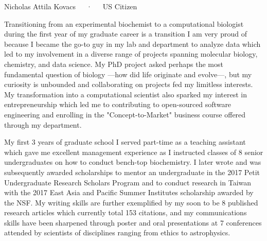 \documentclass[11pt, letterpaper]{CV_latex_class}
\begin{document}
\makecvheader

\makecvfooter
  {Nicholas Attila Kovacs~~~·~~~US Citizen}

\makelettertitle

\begin{cvletter}


\hspace{1em} Transitioning from an experimental biochemist to a computational biologist during the first year of my graduate career is a transition I am very proud of because I became the go-to guy in my lab and department to analyze data which led to my involvement in a diverse range of projects spanning molecular biology, chemistry, and data science. My PhD project asked perhaps the most fundamental question of biology ---how did life originate and evolve---, but my curiosity is unbounded and collaborating on projects fed my limitless interests. My transformation into a computational scientist also sparked my interest in entrepreneurship which led me to contributing to open-sourced software engineering and enrolling in the "Concept-to-Market" business course offered through my department.

\hspace{1em} My first 3 years of graduate school I served part-time as a teaching assistant which gave me excellent management experience as I instructed classes of 8 senior undergraduates on how to conduct bench-top biochemistry. I later wrote and was subsequently awarded scholarships to mentor an undergraduate in the 2017 Petit Undergraduate Research Scholars Program and to conduct research in Taiwan with the 2017 East Asia and Pacific Summer Institutes scholarship awarded by the NSF. My writing skills are further exemplified by my soon to be 8 published research articles which currently total 153 citations, and my communications skills have been sharpened through poster and oral presentations at 7 conferences attended by scientists of disciplines ranging from ethics to astrophysics.


\end{cvletter}
\end{document}
